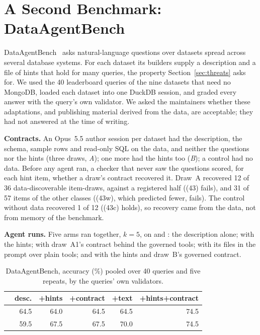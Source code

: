 \section{A Second Benchmark: DataAgentBench}
\label{app:dab}

DataAgentBench~\cite{dab-berkeley} asks natural-language questions over
datasets spread across several database systems. For each dataset its
builders supply a description and a file of hints that hold for many
queries, the property Section~\ref{sec:threats} asks for. We used the 40
leaderboard queries of the nine datasets that need no MongoDB, loaded each
dataset into one DuckDB session, and graded every answer with the query's
own validator. We asked the maintainers whether these adaptations, and
publishing material derived from the data, are acceptable; they had not
answered at the time of writing.

\textbf{Contracts.} An Opus~5.5 author session per dataset had the
description, the schema, sample rows and read-only SQL on the data, and
neither the questions nor the hints (three draws, \emph{A}); one more had
the hints too (\emph{B}); a control had no data. Before any agent ran, a
checker that never saw the questions scored, for each hint item, whether a
draw's contract recovered it. Draw~A recovered 12 of 36 data-discoverable
item-draws, against a registered half ((43) fails), and 31 of 57 items of
the other classes ((43w), which predicted fewer, fails). The control without
data recovered 1 of 12 ((43c) holds), so recovery came from the data, not
from memory of the benchmark.

\textbf{Agent runs.} Five arms ran together, $k{=}5$, on \mLuna{} and
\mQwen{}: the description alone; with the hints; with draw~A1's contract
behind the governed tools; with its files in the prompt over plain tools;
and with the hints and draw~B's governed contract.

\begin{table}[h]
\centering
\footnotesize
\setlength{\tabcolsep}{3pt}
\begin{tabular}{@{}lrrrrr@{}}
\toprule
& desc. & +hints & +contract & +text & +hints+contract \\
\midrule
\mLuna{} & 64.5 & 64.0 & 64.5 & 64.5 & 74.5 \\
\mQwen{} & 59.5 & 67.5 & 67.5 & 70.0 & 74.5 \\
\bottomrule
\end{tabular}
\caption{DataAgentBench, accuracy (\%) pooled over 40 queries and five
repeats, by the queries' own validators.}
\label{tab:dab}
\end{table}

